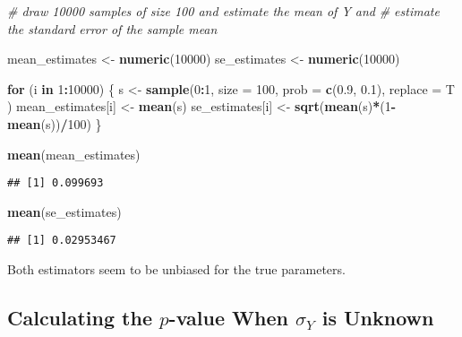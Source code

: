 \documentclass[]{book}
\newenvironment{Shaded}{\begin{snugshade}}{\end{snugshade}}
\newcommand{\KeywordTok}[1]{\textcolor[rgb]{0.13,0.29,0.53}{\textbf{#1}}}
\newcommand{\DataTypeTok}[1]{\textcolor[rgb]{0.13,0.29,0.53}{#1}}
\newcommand{\DecValTok}[1]{\textcolor[rgb]{0.00,0.00,0.81}{#1}}
\newcommand{\FloatTok}[1]{\textcolor[rgb]{0.00,0.00,0.81}{#1}}
\newcommand{\StringTok}[1]{\textcolor[rgb]{0.31,0.60,0.02}{#1}}
\newcommand{\CommentTok}[1]{\textcolor[rgb]{0.56,0.35,0.01}{\textit{#1}}}
\newcommand{\ControlFlowTok}[1]{\textcolor[rgb]{0.13,0.29,0.53}{\textbf{#1}}}
\newcommand{\OperatorTok}[1]{\textcolor[rgb]{0.81,0.36,0.00}{\textbf{#1}}}
\newcommand{\NormalTok}[1]{#1}
\theoremstyle{definition}
\theoremstyle{definition}
\theoremstyle{definition}
\theoremstyle{remark}
\begin{document}
\begin{Shaded}
\begin{Highlighting}[]
\CommentTok{# draw 10000 samples of size 100 and estimate the mean of Y and}
\CommentTok{# estimate the standard error of the sample mean}

\NormalTok{mean_estimates <-}\StringTok{ }\KeywordTok{numeric}\NormalTok{(}\DecValTok{10000}\NormalTok{)}
\NormalTok{se_estimates <-}\StringTok{ }\KeywordTok{numeric}\NormalTok{(}\DecValTok{10000}\NormalTok{)}

\ControlFlowTok{for}\NormalTok{ (i }\ControlFlowTok{in} \DecValTok{1}\OperatorTok{:}\DecValTok{10000}\NormalTok{) \{}
\NormalTok{  s <-}\StringTok{ }\KeywordTok{sample}\NormalTok{(}\DecValTok{0}\OperatorTok{:}\DecValTok{1}\NormalTok{, }
              \DataTypeTok{size =} \DecValTok{100}\NormalTok{,  }
              \DataTypeTok{prob =} \KeywordTok{c}\NormalTok{(}\FloatTok{0.9}\NormalTok{, }\FloatTok{0.1}\NormalTok{),}
              \DataTypeTok{replace =}\NormalTok{ T}
\NormalTok{              )}
\NormalTok{  mean_estimates[i] <-}\StringTok{ }\KeywordTok{mean}\NormalTok{(s)}
\NormalTok{  se_estimates[i] <-}\StringTok{ }\KeywordTok{sqrt}\NormalTok{(}\KeywordTok{mean}\NormalTok{(s)}\OperatorTok{*}\NormalTok{(}\DecValTok{1}\OperatorTok{-}\KeywordTok{mean}\NormalTok{(s))}\OperatorTok{/}\DecValTok{100}\NormalTok{)}
\NormalTok{\}}

\KeywordTok{mean}\NormalTok{(mean_estimates)}
\end{Highlighting}
\end{Shaded}

\begin{verbatim}
## [1] 0.099693
\end{verbatim}

\begin{Shaded}
\begin{Highlighting}[]
\KeywordTok{mean}\NormalTok{(se_estimates)}
\end{Highlighting}
\end{Shaded}

\begin{verbatim}
## [1] 0.02953467
\end{verbatim}

Both estimators seem to be unbiased for the true parameters.

\subsection*{\texorpdfstring{Calculating the \(p\)-value When
\(\sigma_Y\) is
Unknown}{Calculating the p-value When \textbackslash{}sigma\_Y is Unknown}}\label{calculating-the-p-value-when-sigma_y-is-unknown}
\end{document}
